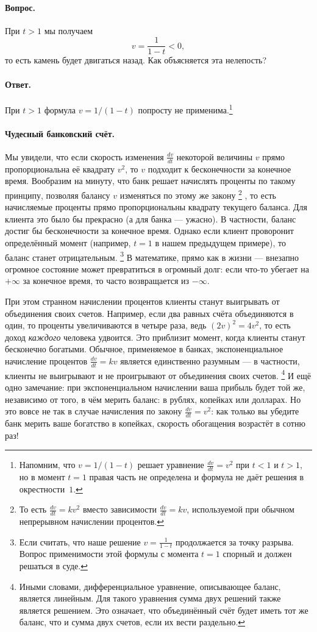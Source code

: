 \paragraph{Вопрос.}
При $t > 1$ мы получаем
\[
v=\frac{1}{1-t} < 0,
\]
то есть камень будет двигаться назад.
Как объясняется эта нелепость?

\paragraph{Ответ.}
При $t > 1$ формула $v=1/(1-t)$ попросту не применима.\footnote{Напомним, что $v=1/(1-t)$ решает уравнение $\tfrac{dv}{dt}=v^2$ при $t<1$ и $t>1$, но в момент $t=1$ правая часть не определена и формула не даёт решения в окрестности~$1$.}

\paragraph{Чудесный банковский счёт.}
Мы увидели, что если скорость изменения $\tfrac{dv}{dt}$
некоторой величины $v$ прямо пропорциональна её квадрату $v^{2}$,
то $v$ подходит к бесконечности за конечное время.
Вообразим на минуту, что банк решает начислять проценты по такому принципу,
позволяя балансу $v$ изменяться по этому же закону%
\footnote{То есть $\tfrac{dv}{dt}=kv^2$ вместо зависимости $\tfrac{dv}{dt}=kv$, используемой при обычном непрерывном начислении процентов.}%
, то есть начисляемые проценты прямо пропорциональны квадрату текущего баланса.
Для клиента это было бы прекрасно (а для банка --- ужасно).
В частности, баланс достиг бы бесконечности за конечное время.
Однако если клиент проворонит определённый момент (например, $t=1$ в нашем предыдущем примере), то баланс станет отрицательным.%
\footnote{Если считать, что наше решение
$v=\frac{1}{1-t}$ продолжается за точку разрыва. Вопрос применимости этой формулы с момента $t=1$ спорный и должен решаться в суде.}
В математике, прямо как в жизни --- внезапно огромное состояние может превратиться в огромный долг: если что-то убегает на $+\infty$ за конечное время, то часто возвращается из $-\infty$.

При этом странном начислении процентов клиенты станут выигрывать от объединения своих счетов.
Например, если два равных счёта объединяются в один,
то проценты увеличиваются в четыре раза, ведь
$(2v)^2=4v^2$,
то есть доход \emph{каждого} человека удвоится.
Это приблизит момент, когда клиенты станут бесконечно богатыми.
Обычное,
применяемое в банках, экспоненциальное начисление процентов
$\frac{dv}{dt}=kv$ является единственно разумным ---
в частности, клиенты не выигрывают и не проигрывают
от объединения своих счетов.%
\footnote{Иными словами, дифференциальное уравнение, описывающее баланс, является линейным.
Для такого уравнения сумма двух решений также является решением.
Это означает, что объединённый счёт будет иметь тот же баланс, что и сумма двух счетов, если их вести раздельно.}
И ещё одно замечание: при экспоненциальном начислении ваша прибыль будет той же, независимо от того, в чём мерить баланс: в рублях, копейках или долларах.
Но это вовсе не так в случае начисления по закону $\tfrac{dv}{dt}=v^2$:
как только вы убедите банк мерить ваше богатство в копейках, скорость обогащения возрастёт в сотню раз!

